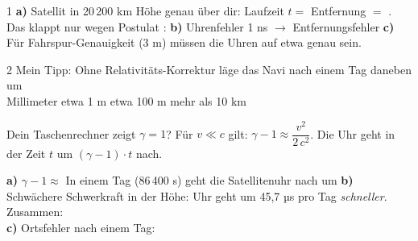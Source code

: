 \documentclass[11pt,a4paper]{article}
\begin{document}

\begin{aufgabe}{1}
\lueckentext
\textbf{a)} Satellit in 20\,200 km Höhe genau über dir: Laufzeit $t = $ 
 Entfernung $=$ . Das klappt nur wegen Postulat : 
\textbf{b)} Uhrenfehler 1 ns $\to$ Entfernungsfehler 
\textbf{c)} Für Fahrspur-Genauigkeit (3 m) müssen die Uhren auf etwa  genau sein.
\end{aufgabe}

\begin{aufgabe}[Die Satellitenuhr: \bea{Handy = Bea}, \zoe{Satellit = Zoe}, $v = 3870$ m/s]{2}
Mein Tipp: Ohne Relativitäts-Korrektur läge das Navi nach einem Tag daneben um\\
 Millimeter \quad {} etwa 1 m \quad {} etwa 100 m \quad {} mehr als 10 km\\[1mm]
\begin{hinweis}
Dein Taschenrechner zeigt $\gamma = 1$? Für $v \ll c$ gilt: \quad $\gamma - 1 \approx \dfrac{v^2}{2\,c^2}$. \quad Die Uhr geht in der Zeit $t$ um $(\gamma - 1)\cdot t$ nach.
\end{hinweis}
\lueckentext
\textbf{a)} $\gamma - 1 \approx$ 
 In einem Tag (86\,400 s) geht die Satellitenuhr nach um 
\textbf{b)} Schwächere Schwerkraft in der Höhe: Uhr geht um 45,7 µs pro Tag \textit{schneller}. Zusammen:\\ 
\textbf{c)} Ortsfehler nach einem Tag: 
\end{aufgabe}
\end{document}
